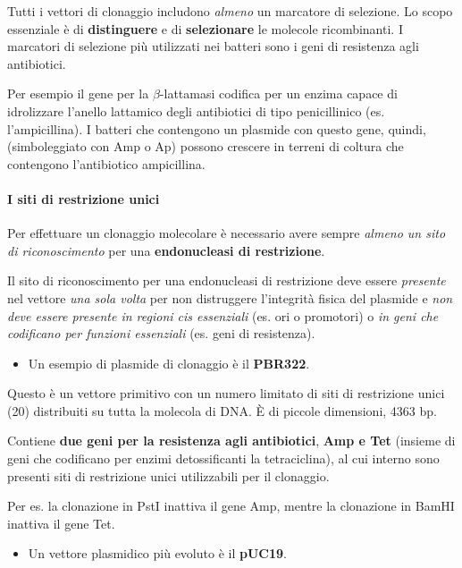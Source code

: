\documentclass[]{article}
\begin{document}
Tutti i vettori di clonaggio includono \emph{almeno} un marcatore di
selezione. Lo scopo essenziale è di \textbf{distinguere} e di
\textbf{selezionare} le molecole ricombinanti. I marcatori di selezione
più utilizzati nei batteri sono i geni di resistenza agli antibiotici.

Per esempio il gene per la \(\beta\)-lattamasi codifica per un enzima
capace di idrolizzare l'anello lattamico degli antibiotici di tipo
penicillinico (es. l'ampicillina). I batteri che contengono un plasmide
con questo gene, quindi,(simboleggiato con Amp o Ap) possono crescere in
terreni di coltura che contengono l'antibiotico ampicillina.

\paragraph{I siti di restrizione
unici}\label{i-siti-di-restrizione-unici}

Per effettuare un clonaggio molecolare è necessario avere sempre
\emph{almeno un sito di riconoscimento} per una \textbf{endonucleasi di
restrizione}.

Il sito di riconoscimento per una endonucleasi di restrizione deve
essere \emph{presente} nel vettore \emph{una sola volta} per non
distruggere l'integrità fisica del plasmide e \emph{non deve essere
presente in regioni cis essenziali} (es. ori o promotori) o \emph{in
geni che codificano per funzioni essenziali} (es. geni di resistenza).

\begin{itemize}
\itemsep1pt\parskip0pt
\item
  Un esempio di plasmide di clonaggio è il \textbf{PBR322}.
\end{itemize}

Questo è un vettore primitivo con un numero limitato di siti di
restrizione unici (20) distribuiti su tutta la molecola di DNA. È di
piccole dimensioni, 4363 bp.

Contiene \textbf{due geni per la resistenza agli antibiotici},
\textbf{Amp e Tet} (insieme di geni che codificano per enzimi
detossificanti la tetraciclina), al cui interno sono presenti siti di
restrizione unici utilizzabili per il clonaggio.

Per es. la clonazione in PstI inattiva il gene Amp, mentre la clonazione
in BamHI inattiva il gene Tet.

\begin{itemize}
\itemsep1pt\parskip0pt
\item
  Un vettore plasmidico più evoluto è il \textbf{pUC19}.
\end{itemize}
\end{document}
